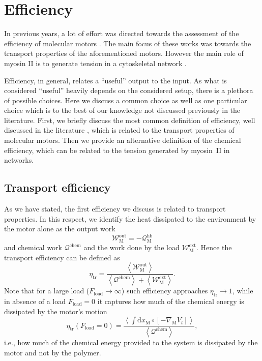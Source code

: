 \documentclass[aps,pre,twocolumn,showpacs,showkeys,superscriptaddress,floatfix]{revtex4-1}
\newcommand{\rmd}{{\mathrm d}}
\begin{document}
\section{Efficiency} 
\label{sec:efficiency}
In previous years, a lot of effort was directed towards the assessment of the efficiency of molecular motors \cite{Schmiedl2008,boksenbojm2009entropy,parmeggiani1999energy,parrondo1998efficiency,zhang2009efficiency}. 
The main focus of these works was towards the transport properties of the aforementioned motors. 
However the main role of myosin II is to generate tension in a cytoskeletal network \cite{ma2012nonmuscle,chugh2017actin,monier2010actomyosin}.

Efficiency, in general, relates a ``useful'' output to the input.
As what is considered ``useful'' heavily depends on the considered setup, there is a plethora of possible choices.
Here we discuss a common choice as well as one particular choice which is to the best of our knowledge not discussed previously in the literature. 
First, we briefly discuss the most common definition of efficiency, well discussed in the literature \cite{Schmiedl2008,boksenbojm2009entropy,parmeggiani1999energy,zhang2009efficiency}, which is related to the transport properties of molecular motors. 
Then we provide an alternative definition of the chemical efficiency, which can be related to the tension generated by myosin~II in networks. 

\subsection{Transport efficiency} 
As we have stated, the first efficiency we discuss is related to transport properties. 
In this respect, we identify the heat dissipated to the environment by the motor alone as the output work 
\[
{\mathcal W}^\text{out}_\text{M} = - {\mathcal Q}^\text{hb}_\text{M} 
\] 
and chemical work $\mathcal Q^\text{chem}$ and the work done by the load $\mathcal W^\text{ext}_\text{M}$.
Hence the transport efficiency can be defined as 
\[
\eta_\text{tr} = \frac{ \left\langle {\mathcal W}^\text{out}_\text{M} \right\rangle }{ \left\langle {\mathcal Q}^\text{chem} \right\rangle + \left\langle {\mathcal W}^\text{ext}_\text{M} \right\rangle } .
\]
Note that for a large load ($F_\text{load} \to \infty$) such efficiency approaches $\eta_\text{tr} \to 1$, 
while in absence of a load $F_\text{load} = 0$ it captures how much of the chemical energy is dissipated by the motor's motion  
\[
\eta_\text{tr}( F_\text{load} = 0 ) = \frac{ \left\langle \int \rmd x_\text{M} \circ \left[ - \nabla_\text{M} V_t \right] \right\rangle }{ \left\langle {\mathcal Q}^\text{chem} \right\rangle } ,
\]
i.e., how much of the chemical energy provided to the system is dissipated by the motor and not by the polymer. 
\end{document}
